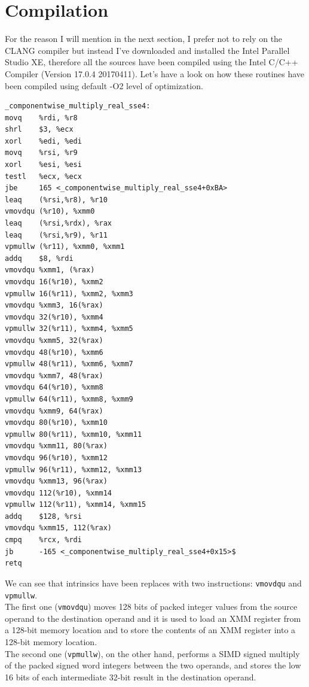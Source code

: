 \documentclass[paper=a4, fontsize=12pt]{scrartcl} %
\numberwithin{equation}{section}
\numberwithin{figure}{section}
\numberwithin{table}{section}
\begin{document}
\section{Compilation}
For the reason I will mention in the next section, I prefer not to rely on the CLANG compiler but
instead I've downloaded and installed the Intel Parallel Studio XE, therefore
all the sources have been compiled using the Intel C/C++ Compiler (Version 17.0.4 20170411).
Let's have a look on how these routines have been compiled using default -O2 level of optimization.

\begin{lstlisting}[basicstyle=\ttfamily, caption=AVX2 Implementation with 8-way loop unrolling]
_componentwise_multiply_real_sse4:
movq    %rdi, %r8
shrl    $3, %ecx
xorl    %edi, %edi
movq    %rsi, %r9
xorl    %esi, %esi
testl   %ecx, %ecx
jbe     165 <_componentwise_multiply_real_sse4+0xBA>
leaq    (%rsi,%r8), %r10
vmovdqu (%r10), %xmm0
leaq    (%rsi,%rdx), %rax
leaq    (%rsi,%r9), %r11
vpmullw (%r11), %xmm0, %xmm1
addq    $8, %rdi
vmovdqu %xmm1, (%rax)
vmovdqu 16(%r10), %xmm2
vpmullw 16(%r11), %xmm2, %xmm3
vmovdqu %xmm3, 16(%rax)
vmovdqu 32(%r10), %xmm4
vpmullw 32(%r11), %xmm4, %xmm5
vmovdqu %xmm5, 32(%rax)
vmovdqu 48(%r10), %xmm6
vpmullw 48(%r11), %xmm6, %xmm7
vmovdqu %xmm7, 48(%rax)
vmovdqu 64(%r10), %xmm8
vpmullw 64(%r11), %xmm8, %xmm9
vmovdqu %xmm9, 64(%rax)
vmovdqu 80(%r10), %xmm10
vpmullw 80(%r11), %xmm10, %xmm11
vmovdqu %xmm11, 80(%rax)
vmovdqu 96(%r10), %xmm12
vpmullw 96(%r11), %xmm12, %xmm13
vmovdqu %xmm13, 96(%rax)
vmovdqu 112(%r10), %xmm14
vpmullw 112(%r11), %xmm14, %xmm15
addq    $128, %rsi
vmovdqu %xmm15, 112(%rax)
cmpq    %rcx, %rdi
jb      -165 <_componentwise_multiply_real_sse4+0x15>$
retq
\end{lstlisting}
We can see that intrinsics have been replaces with two instructions: \texttt{vmovdqu} and \texttt{vpmullw}.\\

The first one (\texttt{vmovdqu}) moves 128 bits of packed integer values from the source operand
to the destination operand and it is used to load an XMM register from a 128-bit memory
location and to store the contents of an XMM register into a 128-bit memory location.\\

The second one (\texttt{vpmullw}), on the other hand, performs a SIMD signed multiply of the
packed signed word integers between the two operands, and stores the low 16 bits
of each intermediate 32-bit result in the destination operand.\\
\end{document}

